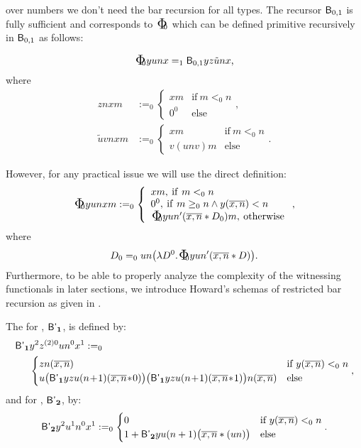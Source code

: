 over numbers we don't need the bar recursion for all types.
The recursor $\textsf{\upshape B}_{0,1}$ is fully sufficient and
corresponds to $\bPhi_0$ which can be defined 
primitive recursively in $\textsf{\upshape B}_{0,1}$ as follows:
%
\begin{dfn}\label{d:PhiB}
\[ \bPhi_0 yunx =_{1} \B_{ 0, 1}yz\tilde unx \text{,}\]
where
\begin{align*} 
znxm&:=_{0} \begin{cases} 
  xm &\text{if}\ m<_0n\\
  0^0 &\text{else}
\end{cases} \text{,} \\
\tilde uvnxm&:=_{0} \begin{cases} 
  xm &\text{if}\ m<_0n\\
  v(unv)m &\text{else}
\end{cases} \text{.} 
\end{align*}
\end{dfn}
%
%
However, for any practical issue we will use the direct definition:
\[  \bPhi_0 yunxm:=_{0}\left\{ \begin{array}{l} 
        xm,\: \mathrm{if}\ m<_0n\\
        0^0,\: \mathrm{if}\ m\geq_0n \wedge y(\overline{x,n})<n\\
        \bPhi_0 yun' (\overline{x,n}*D_0)m,\: \mathrm{otherwise}
\end{array} \right. \text{,} \]
where
\[ D_0=_0 un\big(\lambda D^0.\bPhi_0 yun'(\overline{x,n}*D)\big)\text{.} \]
%
%
Furthermore, to be able to properly analyze the complexity of the witnessing functionals 
in later sections, we introduce Howard's schemas of restricted bar recursion as given
in \cite{Howard81}.
\begin{dfn}\label{d:rBR}
The  for , $\textsf{\upshape B'}_{\mathbf1}$, is defined by:
\begin{align*}
\rB_\one&y^2z^{(2)0}un^0x^1:=_0\\
   &\begin{cases}
   zn(\overline{x,n})&\text{if}\ y(\overline{x,n})<_0n\\
   u\big(\rB_\one yzu(n\!+\!1)(\overline{x,n}\!*\!0)\big)
    \big(\rB_\one yzu(n\!+\!1)(\overline{x,n}\!*\!1)\big)
    n(\overline{x,n})&\text{else}
   \end{cases}\text{,}
\end{align*}
and for , $\textsf{\upshape B'}_{\mathbf2}$, by:
\[
\textsf{\upshape B'}_{\mathbf2} y^2u^1n^0x^1:=_0
   \begin{cases}
   0&\text{if}\ y(\overline{x,n})<_0n\\
   1+\textsf{\upshape B'}_{\mathbf2} yu(n+1)\big(\overline{x,n}*(un)\big)&\text{else}
   \end{cases}\text{.}
\]
\end{dfn}
